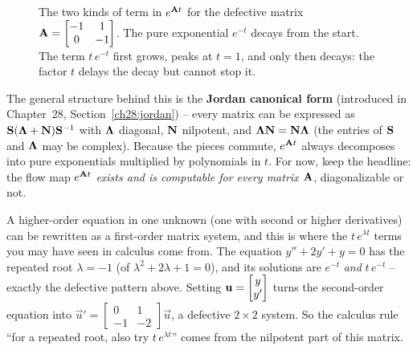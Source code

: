 \begin{figure}[htbp]
\centering
{}
\caption{The two kinds of term in $e^{\mathbf{A}t}$ for the defective matrix
$\mathbf{A}=\protect\begin{bmatrix}-1&1\\0&-1\protect\end{bmatrix}$. The pure
exponential $e^{-t}$ decays from the start. The term $t\,e^{-t}$ first grows,
peaks at $t=1$, and only then decays: the factor $t$ delays the decay but
cannot stop it.}
\label{ch25:fig-defective}
\end{figure}

\begin{remark}
The general structure behind this is the \textbf{Jordan canonical form}
(introduced in Chapter~28, Section~\ref{ch28:jordan}) -- every matrix can be expressed as
$\mathbf{S}(\mathbf{\Lambda}+\mathbf{N})\mathbf{S}^{-1}$ with $\mathbf{\Lambda}$ diagonal,
$\mathbf{N}$ nilpotent, and $\mathbf{\Lambda}\mathbf{N}=\mathbf{N}\mathbf{\Lambda}$ (the
entries of $\mathbf{S}$ and $\mathbf{\Lambda}$ may be complex). Because
the pieces commute, $e^{\mathbf{A}t}$ always decomposes into pure exponentials
multiplied by polynomials in $t$. For now, keep the headline: the flow map
$e^{\mathbf{A}t}$ \emph{exists and is computable for every matrix $\mathbf{A}$},
diagonalizable or not.
\end{remark}

\begin{connectionbox}
A higher-order equation in one unknown (one with second or higher derivatives)
can be rewritten as a first-order matrix system, and this is where the
$t\,e^{\lambda t}$ terms you may have seen in calculus come from. The equation
$y'' + 2y' + y = 0$ has the repeated root $\lambda=-1$ (of
$\lambda^2+2\lambda+1=0$), and its solutions are
$e^{-t}$ \emph{and} $t\,e^{-t}$ -- exactly the defective pattern above. Setting
$\mathbf{u}=\begin{bmatrix}y\\y'\end{bmatrix}$ turns the second-order equation into
$\vec{u}'=\begin{bmatrix}0&1\\-1&-2\end{bmatrix}\vec{u}$, a defective $2\times2$
system. So the calculus rule ``for a repeated root, also try $t\,e^{\lambda t}$''
comes from the nilpotent part of this matrix.
\end{connectionbox}

